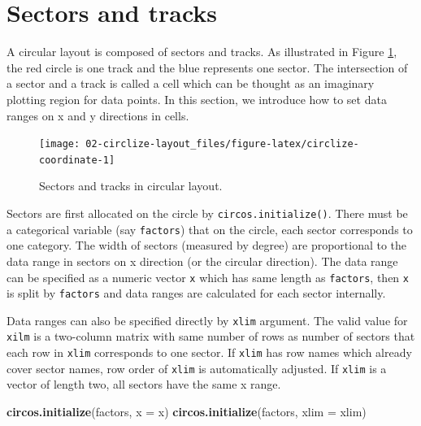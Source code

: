 \documentclass[]{book}
\newenvironment{Shaded}{\begin{snugshade}}{\end{snugshade}}
\newcommand{\KeywordTok}[1]{\textcolor[rgb]{0.13,0.29,0.53}{\textbf{#1}}}
\newcommand{\DataTypeTok}[1]{\textcolor[rgb]{0.13,0.29,0.53}{#1}}
\newcommand{\NormalTok}[1]{#1}
\begin{document}
\section{Sectors and tracks}\label{sectors-and-tracks}

A circular layout is composed of sectors and tracks. As illustrated in
Figure \ref{fig:circlize-coordinate}, the red circle is one track and
the blue represents one sector. The intersection of a sector and a track
is called a cell which can be thought as an imaginary plotting region
for data points. In this section, we introduce how to set data ranges on
x and y directions in cells.

\begin{figure}

{\centering \texttt{[image: 02-circlize-layout\_files/figure-latex/circlize-coordinate-1]} 

}

\caption{Sectors and tracks in circular layout.}\label{fig:circlize-coordinate}
\end{figure}

Sectors are first allocated on the circle by
\texttt{circos.initialize()}. There must be a categorical variable (say
\texttt{factors}) that on the circle, each sector corresponds to one
category. The width of sectors (measured by degree) are proportional to
the data range in sectors on x direction (or the circular direction).
The data range can be specified as a numeric vector \texttt{x} which has
same length as \texttt{factors}, then \texttt{x} is split by
\texttt{factors} and data ranges are calculated for each sector
internally.

Data ranges can also be specified directly by \texttt{xlim} argument.
The valid value for \texttt{xilm} is a two-column matrix with same
number of rows as number of sectors that each row in \texttt{xlim}
corresponds to one sector. If \texttt{xlim} has row names which already
cover sector names, row order of \texttt{xlim} is automatically
adjusted. If \texttt{xlim} is a vector of length two, all sectors have
the same x range.

\begin{Shaded}
\begin{Highlighting}[]
\KeywordTok{circos.initialize}\NormalTok{(factors, }\DataTypeTok{x =}\NormalTok{ x)}
\KeywordTok{circos.initialize}\NormalTok{(factors, }\DataTypeTok{xlim =}\NormalTok{ xlim)}
\end{Highlighting}
\end{Shaded}
\end{document}
